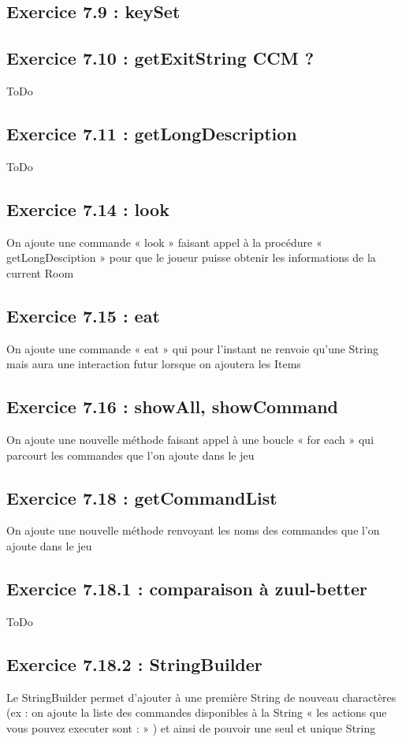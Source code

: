 \documentclass[twoside,french]{report}
\begin{document}
\subsection*{Exercice 7.9 : keySet}

\subsection*{Exercice 7.10 : getExitString CCM ?}

ToDo

\subsection*{Exercice 7.11 : getLongDescription}

ToDo

\subsection*{Exercice 7.14 :  look}
On ajoute une commande « look » faisant appel à la procédure  « getLongDesciption »  pour que le joueur puisse obtenir les informations de la current Room

\subsection*{Exercice 7.15 : eat}
On ajoute une commande « eat » qui pour l’instant ne renvoie qu’une String mais aura une interaction futur lorsque on ajoutera les Items

\subsection*{Exercice 7.16 : showAll, showCommand}
On ajoute une nouvelle méthode faisant appel à une boucle « for each » qui parcourt les commandes que l’on ajoute dans le jeu

\subsection*{Exercice 7.18 : getCommandList}
On ajoute une nouvelle méthode renvoyant les noms des commandes que l’on ajoute dans le jeu

\subsection*{Exercice 7.18.1 : comparaison à zuul-better}
ToDo

\subsection*{Exercice 7.18.2 : StringBuilder}
Le StringBuilder permet d’ajouter à une première String de nouveau charactères (ex : on ajoute la liste des commandes disponibles à la String « les actions que vous pouvez executer sont : » ) et ainsi de pouvoir une seul et unique String
\end{document}
